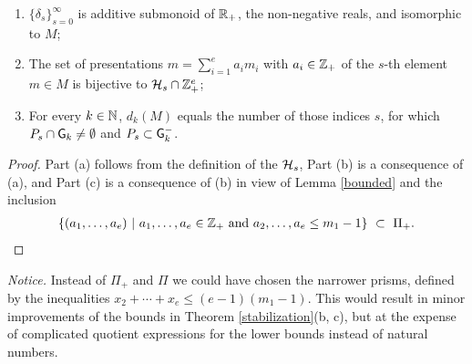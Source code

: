 \begin{lemma}\label{stratification}
\leavevmode
\begin{enumerate}[label=(\alph*)]
\item $\{\delta_s\}_{s=0}^\infty$ is additive submonoid of $\mathbb R_+$, the non-negative reals, and isomorphic to $M$;
\item The set of presentations $m=\sum_{i=1}^ea_im_i$ with $a_i\in\mathbb Z_+$ of the $s$-th element $m\in M$ is bijective to $\mathcal{H}_s\cap\mathbb Z^e_+$;
\item For every $k\in\mathbb N$, $d_k(M)$ equals the number of those indices $s$, for which $P_s\cap\mathsf{G}_k\not=\emptyset$ and $P_s\subset\mathsf{G}_k^-$. 
\end{enumerate}
\end{lemma}

\begin{proof} Part (a) follows from the definition of the $\mathcal{H}_s$, Part (b) is a consequence of (a), and Part (c) is a consequence of (b) in view of Lemma \ref{bounded} and the inclusion
\begin{align*}
\{(a_1,\ldots,a_e)\ |\ a_1,\ldots,a_e\in\ZZ_+\ \text{and}\ a_2,\ldots,a_e\le m_1-1\}\ \subset\ \Pi_+.
\end{align*}
\end{proof}

\medskip\noindent\emph{Notice.} Instead of $\Pi_+$ and $\Pi$ we could have chosen the narrower prisms, defined by the inequalities $x_2+\cdots+x_e\le(e-1)(m_1-1)$. This would result in minor improvements of the bounds in Theorem \ref{stabilization}(b, c), but at the expense of complicated quotient expressions for the lower bounds instead of natural numbers.

